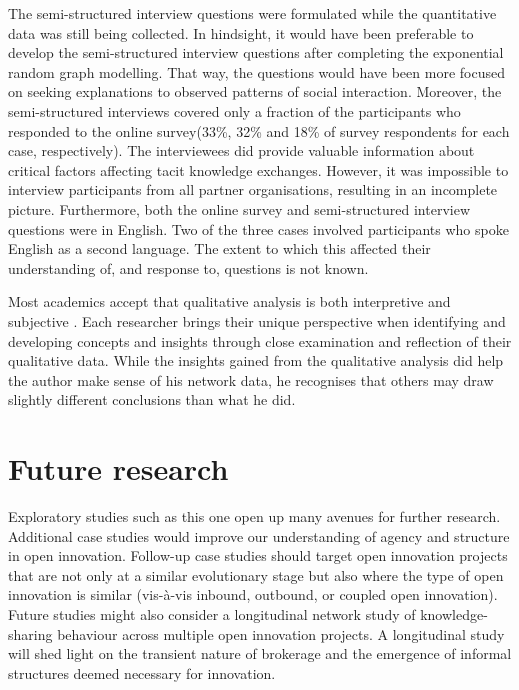 The semi-structured interview questions were formulated while the quantitative data was still being collected. In hindsight, it would have been preferable to develop the semi-structured interview questions after completing the exponential random graph modelling. That way, the questions would have been more focused on seeking explanations to observed patterns of social interaction. Moreover, the semi-structured interviews covered only a fraction of the participants who responded to the online survey(33\%, 32\% and 18\% of survey respondents for each case, respectively). The interviewees did provide valuable information about critical factors affecting tacit knowledge exchanges. However, it was impossible to interview participants from all partner organisations, resulting in an incomplete picture. Furthermore, both the online survey and semi-structured interview questions were in English. Two of the three cases involved participants who spoke English as a second language. The extent to which this affected their understanding of, and response to, questions is not known. \medskip

Most academics accept that qualitative analysis is both interpretive and subjective \citep{aspers2019qualitative}. Each researcher brings their unique perspective when identifying and developing concepts and insights through close examination and reflection of their qualitative data. While the insights gained from the qualitative analysis did help the author make sense of his network data, he recognises that others may draw slightly different conclusions than what he did.

\section{Future research}

Exploratory studies such as this one open up many avenues for further research. Additional case studies would improve our understanding of agency and structure in open innovation. Follow-up case studies should target open innovation projects that are not only at a similar evolutionary stage but also where the type of open innovation is similar (vis-\`a-vis inbound, outbound, or coupled open innovation). Future studies might also consider a longitudinal network study of knowledge-sharing behaviour across multiple open innovation projects. A longitudinal study will shed light on the transient nature of brokerage and the emergence of informal structures deemed necessary for innovation.  \medskip

